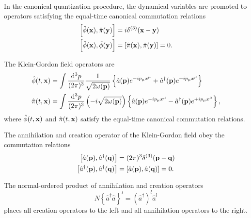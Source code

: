 \begin{definition}
	In the canonical quantization procedure, the dynamical variables are promoted to operators satisfying the equal-time canonical commutation relations
	\begin{align}
		\comm{\hat\phi(\vb{x})}{\hat\pi(\vb{y})}
		&=
		i\delta^{(3)}(\vb{x}-\vb{y})
		\\
		\comm{\hat\phi(\vb{x})}{\hat\phi(\vb{y})}
		&=
		\comm{\hat\pi(\vb{x})}{\hat\pi(\vb{y})}
		=
		0
		\label{eq:qkg_comm_pm}
		.
	\end{align}
\end{definition}
\begin{theorem}
	The Klein-Gordon field operators are
	\begin{align}
		\hat\phi(t,\vb{x})
		&=
		\int\frac{\dd[3]{p}}{(2\pi)^3}
		\frac{1}{\sqrt{2\omega(\vb{p})}}
		\left\{
			\hat{a}(\vb{p})
			e^{-ip_\mu x^\mu}
			+
			\hat{a}^\dagger(\vb{p})
			e^{+ip_\mu x^\mu}
		\right\}
		\label{eq:qkg_pos}
		\\
		\hat\pi(t,\vb{x})
		&=
		\int\frac{\dd[3]{p}}{(2\pi)^3}
		\left(-i\sqrt{2\omega(\vb{p})}\right)
		\left\{
			\hat{a}(\vb{p})
			e^{-ip_\mu x^\mu}
			-
			\hat{a}^\dagger(\vb{p})
			e^{+ip_\mu x^\mu}
		\right\}
		\label{eq:qkg_mom}
		,
	\end{align}
	where $\hat\phi(t,\vb{x})$ and $\hat\pi(t,\vb{x})$ satisfy the equal-time canonical commutation relations.
\end{theorem}
\begin{theorem}\label{thm:kg_comm_ac}
	The annihilation and creation operator of the Klein-Gordon field obey the commutation relations
	\begin{align}
		\comm{\hat{a}(\vb{p})}{\hat{a}^\dagger(\vb{q})}
		&=
		(2\pi)^3
		\delta^{(3)}(\vb{p}-\vb{q})
		\\
		\comm{\hat{a}^\dagger(\vb{p})}{\hat{a}^\dagger(\vb{q})}
		&=
		\comm{\hat{a}(\vb{p})}{\hat{a}(\vb{q})}
		=
		0
		\label{eq:kg_comm_ac}
		.
	\end{align}	
\end{theorem}
\begin{definition}
	The normal-ordered product of annihilation and creation operators
	\begin{equation}
		N\left\{
			\hat{a}^\dagger
			\hat{a}
		\right\}^l
		=
		\left(\hat{a}^\dagger\right)^l
		\hat{a}^l
	\end{equation}
	places all creation operators to the left and all annihilation operators to the right.
\end{definition}
